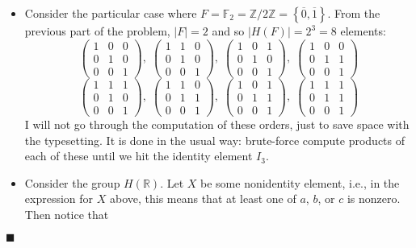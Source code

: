 \documentclass[12pt]{article}
\renewcommand{\qed}{\hfill$\blacksquare$}
\renewenvironment{proof}{\begin{addmargin}[1em]{0em}\begin{newproof}}{\end{newproof}\end{addmargin}\qed}
\begin{document}
\begin{proof}
\begin{itemize}
    \item Consider the particular case where $F=\mathbb{F}_2=\mathbb{Z}/2\mathbb{Z}=\left\{\overline{0},\overline{1}\right\}$. From the previous part of the problem, $\left|F\right|=2$ and so $\left|H\left(F\right)\right|=2^3=8$ elements:
    $$ \left(\begin{array}{ccc} 1 & 0 & 0 \\ 0 & 1 & 0 \\ 0 & 0 & 1 \end{array}\right), \; \left(\begin{array}{ccc} 1 & 1 & 0 \\ 0 & 1 & 0 \\ 0 & 0 & 1 \end{array}\right), \; \left(\begin{array}{ccc} 1 & 0 & 1 \\ 0 & 1 & 0 \\ 0 & 0 & 1 \end{array}\right), \; \left(\begin{array}{ccc} 1 & 0 & 0 \\ 0 & 1 & 1 \\ 0 & 0 & 1 \end{array}\right) $$
    $$ \left(\begin{array}{ccc} 1 & 1 & 1 \\ 0 & 1 & 0 \\ 0 & 0 & 1 \end{array}\right), \; \left(\begin{array}{ccc} 1 & 1 & 0 \\ 0 & 1 & 1 \\ 0 & 0 & 1 \end{array}\right), \; \left(\begin{array}{ccc} 1 & 0 & 1 \\ 0 & 1 & 1 \\ 0 & 0 & 1 \end{array}\right), \; \left(\begin{array}{ccc} 1 & 1 & 1 \\ 0 & 1 & 1 \\ 0 & 0 & 1 \end{array}\right) $$ I will not go through the computation of these orders, just to save space with the typesetting. It is done in the usual way: brute-force compute products of each of these until we hit the identity element $I_3$.
    \item Consider the group $H\left(\mathbb{R}\right)$. Let $X$ be some nonidentity element, i.e., in the expression for $X$ above, this means that at least one of $a$, $b$, or $c$ is nonzero. Then notice that

\end{itemize}
\end{proof}
\end{document}

